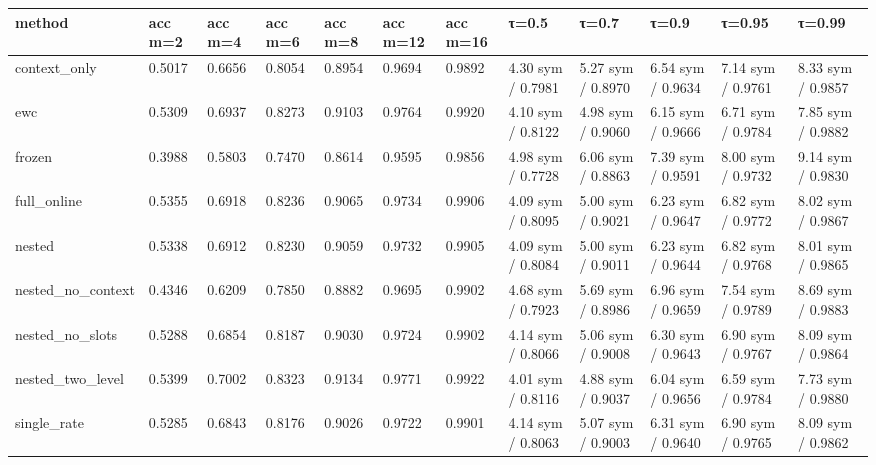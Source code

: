 \begin{tabular}{llllllllllll}
\hline
method & acc m=2 & acc m=4 & acc m=6 & acc m=8 & acc m=12 & acc m=16 & τ=0.5 & τ=0.7 & τ=0.9 & τ=0.95 & τ=0.99 \\
\hline
context\_only & 0.5017 & 0.6656 & 0.8054 & 0.8954 & 0.9694 & 0.9892 & 4.30 sym / 0.7981 & 5.27 sym / 0.8970 & 6.54 sym / 0.9634 & 7.14 sym / 0.9761 & 8.33 sym / 0.9857 \\
ewc & 0.5309 & 0.6937 & 0.8273 & 0.9103 & 0.9764 & 0.9920 & 4.10 sym / 0.8122 & 4.98 sym / 0.9060 & 6.15 sym / 0.9666 & 6.71 sym / 0.9784 & 7.85 sym / 0.9882 \\
frozen & 0.3988 & 0.5803 & 0.7470 & 0.8614 & 0.9595 & 0.9856 & 4.98 sym / 0.7728 & 6.06 sym / 0.8863 & 7.39 sym / 0.9591 & 8.00 sym / 0.9732 & 9.14 sym / 0.9830 \\
full\_online & 0.5355 & 0.6918 & 0.8236 & 0.9065 & 0.9734 & 0.9906 & 4.09 sym / 0.8095 & 5.00 sym / 0.9021 & 6.23 sym / 0.9647 & 6.82 sym / 0.9772 & 8.02 sym / 0.9867 \\
nested & 0.5338 & 0.6912 & 0.8230 & 0.9059 & 0.9732 & 0.9905 & 4.09 sym / 0.8084 & 5.00 sym / 0.9011 & 6.23 sym / 0.9644 & 6.82 sym / 0.9768 & 8.01 sym / 0.9865 \\
nested\_no\_context & 0.4346 & 0.6209 & 0.7850 & 0.8882 & 0.9695 & 0.9902 & 4.68 sym / 0.7923 & 5.69 sym / 0.8986 & 6.96 sym / 0.9659 & 7.54 sym / 0.9789 & 8.69 sym / 0.9883 \\
nested\_no\_slots & 0.5288 & 0.6854 & 0.8187 & 0.9030 & 0.9724 & 0.9902 & 4.14 sym / 0.8066 & 5.06 sym / 0.9008 & 6.30 sym / 0.9643 & 6.90 sym / 0.9767 & 8.09 sym / 0.9864 \\
nested\_two\_level & 0.5399 & 0.7002 & 0.8323 & 0.9134 & 0.9771 & 0.9922 & 4.01 sym / 0.8116 & 4.88 sym / 0.9037 & 6.04 sym / 0.9656 & 6.59 sym / 0.9784 & 7.73 sym / 0.9880 \\
single\_rate & 0.5285 & 0.6843 & 0.8176 & 0.9026 & 0.9722 & 0.9901 & 4.14 sym / 0.8063 & 5.07 sym / 0.9003 & 6.31 sym / 0.9640 & 6.90 sym / 0.9765 & 8.09 sym / 0.9862 \\
\hline
\end{tabular}
